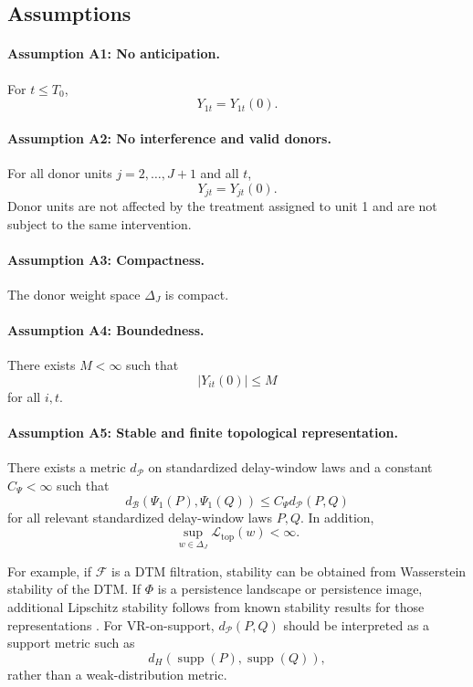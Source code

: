 \documentclass[11pt]{article}
\theoremstyle{plain}
\theoremstyle{definition}
\theoremstyle{remark}
\DeclareMathOperator{\supp}{supp}
\newcommand{\1}{\mathbbm{1}}
\begin{document}
\subsection{Assumptions}

\paragraph{Assumption A1: No anticipation.}
For \(t\le T_0\),
\[
Y_{1t}=Y_{1t}(0).
\]

\paragraph{Assumption A2: No interference and valid donors.}
For all donor units \(j=2,\ldots,J+1\) and all \(t\),
\[
Y_{jt}=Y_{jt}(0).
\]
Donor units are not affected by the treatment assigned to unit 1 and are not
subject to the same intervention.

\paragraph{Assumption A3: Compactness.}
The donor weight space \(\Delta_J\) is compact.

\paragraph{Assumption A4: Boundedness.}
There exists \(M<\infty\) such that
\[
|Y_{it}(0)|\le M
\]
for all \(i,t\).

\paragraph{Assumption A5: Stable and finite topological representation.}
There exists a metric \(d_{\mathcal P}\) on standardized delay-window laws and
a constant \(C_\Psi<\infty\) such that
\[
d_{\mathcal B}
\left(
\Psi_1(P),
\Psi_1(Q)
\right)
\le
C_\Psi d_{\mathcal P}(P,Q)
\]
for all relevant standardized delay-window laws \(P,Q\). In addition,
\[
\sup_{w\in\Delta_J}\mathcal L_{\mathrm{top}}(w)<\infty.
\]

For example, if \(\mathcal F\) is a DTM filtration, stability can be obtained
from Wasserstein stability of the DTM. If \(\Phi\) is a persistence landscape or
persistence image, additional Lipschitz stability follows from known stability
results for those representations
\citep{cohensteiner2007stability,chazal2016structure,bubenik2015statistical,adams2017persistence}.
For VR-on-support, \(d_{\mathcal P}(P,Q)\) should be interpreted as a support
metric such as
\[
d_H(\supp(P),\supp(Q)),
\]
rather than a weak-distribution metric.
\end{document}
